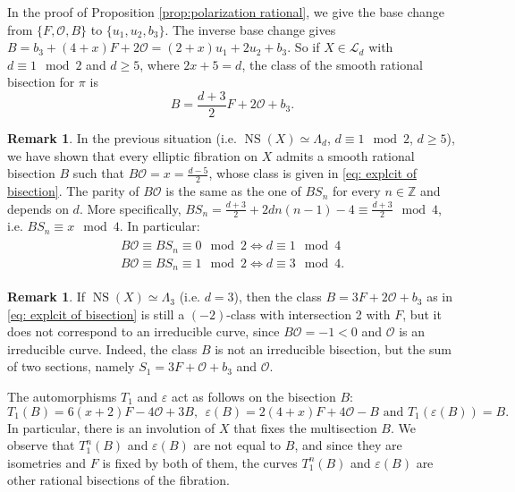 \documentclass{amsart}
\theoremstyle{definition}
\newtheorem{remark}[theorem]{Remark}
\numberwithin{equation}{section}
\DeclareMathOperator{\NS}{NS}
\begin{document}
In the proof of Proposition \ref{prop:polarization rational}, we give the base change from $\{F,\mathcal{O}, B\}$ to $\{u_1,u_2,b_3\}$.  The inverse base change gives $B=b_3+(4+x)F+2\mathcal{O}=(2+x)u_1+2u_2+b_3$. So if $X\in\mathcal{L}_d$ with $d\equiv 1\mod 2$ and $d\geq 5$, where $2x+5=d$, the class of the smooth rational bisection for $\pi$ is 
\begin{equation}\label{eq: explcit of bisection}B=\frac{d+3}{2}F+2\mathcal{O}+b_3.\end{equation}
\begin{remark}\label{rem; intersection B and sections}
In the previous situation (i.e. $\NS(X)\simeq \Lambda_d$, $d\equiv 1\mod 2$, $d\geq 5$), we have shown that every elliptic fibration on $X$ admits a smooth rational bisection $B$ such that $B\mathcal{O}=x=\frac{d-5}{2}$, whose class is given in \eqref{eq: explcit of bisection}. The parity of $B\mathcal{O}$ is the same as the one of $BS_n$ for every $n\in\mathbb{Z}$ and depends on $d$. More specifically, $BS_n=\frac{d+3}{2}+2dn(n-1)-4\equiv \frac{d+3}{2}\mod 4$, i.e. $BS_n\equiv x\mod 4$. In particular:  
\begin{eqnarray}\label{eq: intersection B sections}\begin{array}{c}B\mathcal{O}\equiv BS_n\equiv 0\mod 2 \Leftrightarrow d\equiv 1\mod 4\\
B\mathcal{O}\equiv BS_n\equiv 1\mod 2 \Leftrightarrow d\equiv 3\mod 4.\end{array}\end{eqnarray}
\end{remark}

\begin{remark}\label{rem: the case d=3, spltting of the bisection}
If $\NS(X)\simeq \Lambda_3$ (i.e. $d=3$), then the class $B=3F+2\mathcal{O}+b_3$ as in \eqref{eq: explcit of bisection} is still a $(-2)$-class with intersection 2 with $F$, but it does not correspond to an irreducible curve, since $B\mathcal{O}=-1<0$ and $\mathcal{O}$ is an irreducible curve. Indeed, the class $B$ is not an irreducible bisection, but the sum of two sections, namely $S_1=3F+\mathcal{O}+b_3$ and $\mathcal{O}$.\end{remark}


The automorphisms $T_1$ and $\varepsilon$ act as follows on the bisection $B$:
$$T_1(B)=6(x+2)F-4\mathcal{O}+3B,\ \ \varepsilon(B)=2(4+x)F+4\mathcal{O}-B \mbox{ and } T_1(\varepsilon(B))=B.$$ In particular, there is an involution of $X$ that fixes the multisection $B$. We observe that $T_1^n(B)$ and $\varepsilon(B)$ are not equal to $B$, and since they are isometries and $F$ is fixed by both of them, the curves $T_1^n(B)$ and $\varepsilon(B)$ are other rational bisections of the fibration.
\end{document}
